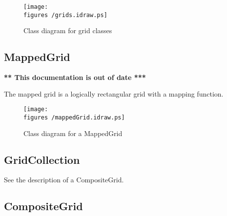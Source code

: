 \documentclass{article}
\newcommand{\figures}{\homeHenshaw/OvertureFigures}
\begin{document}
\begin{figure} \label{fig:grids}
  \begin{center}
  \texttt{[image: \\figures /grids.idraw.ps]}
  \caption{Class diagram for grid classes}
  \end{center}
\end{figure}


% 
% 

\subsection{MappedGrid}

{\bf ***  This documentation is out of date *** }

  The mapped grid is a logically rectangular grid with a mapping
function. 

\begin{figure} \label{fig:mappedGrid}
  \begin{center}
  \texttt{[image: \\figures /mappedGrid.idraw.ps]}
  \caption{Class diagram for a MappedGrid}
  \end{center}
\end{figure}



\subsection{GridCollection}

See the description of a CompositeGrid.


\subsection{CompositeGrid}
\end{document}
